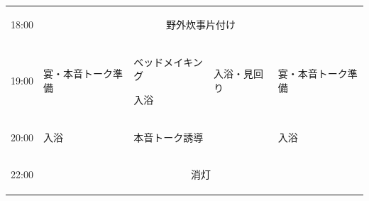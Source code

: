\begin{longtable}[c]{|p{}|p{}|p{}|p{}|p{}|}
  \begin{tpacol}
    18:00
  \end{tpacol}&
  \multicolumn{4}{c|}{野外炊事片付け} \\
  \hdashline

  \begin{tpacol}
    19:00
  \end{tpacol}&
  \begin{tpbcol}
    宴・本音トーク準備
  \end{tpbcol}&
  \begin{tpccol}
    ベッドメイキング\par
    入浴
  \end{tpccol}&
  \begin{tpdcol}
    入浴・見回り
  \end{tpdcol}&
  \begin{tpecol}
    宴・本音トーク準備
  \end{tpecol}\\
  \hdashline

  \begin{tpacol}
    20:00
  \end{tpacol}&
  \begin{tpbcol}
    入浴
  \end{tpbcol}&
  \begin{tpccol}
    本音トーク誘導
  \end{tpccol}&
  \begin{tpdcol}
    
  \end{tpdcol}&
  \begin{tpecol}
    入浴
  \end{tpecol}\\
  \hdashline

  \begin{tpacol}
    22:00
  \end{tpacol}&
  \multicolumn{4}{c|}{消灯} \\

\end{longtable}

